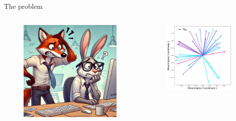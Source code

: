 \begin{frame}{The problem}
\small
\begin{columns}
\begin{column}{0.5\textwidth}
\begin{figure}[h!]
    \centering
    \includegraphics[width=0.8\linewidth]{img/snoots.png} %
\end{figure}

\vspace{-.5cm}
\end{column}
\begin{column}{0.5\textwidth}
\begin{figure}[h!]
    \centering
    \includegraphics[width=1.\linewidth]{../figures/interpretabledirections.png} %
\end{figure}
\vspace{-.5cm}
\end{column}
\end{columns}
\end{frame}

